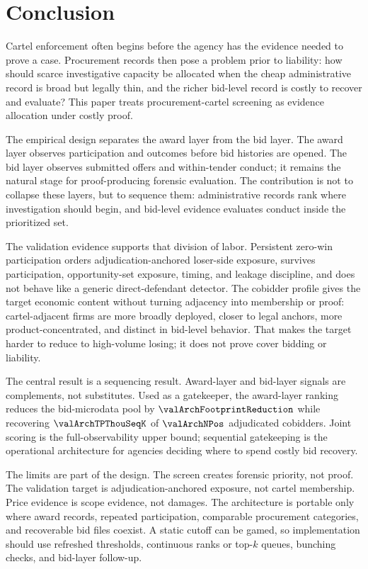 \section{Conclusion}
\label{sec:conclusion}

Cartel enforcement often begins before the agency has the
evidence needed to prove a case. Procurement records then pose a
problem prior to liability: how should scarce investigative
capacity be allocated when the cheap administrative record is
broad but legally thin, and the richer bid-level record is costly
to recover and evaluate? This paper treats procurement-cartel
screening as evidence allocation under costly proof.

The empirical design separates the award layer from the bid
layer. The award layer observes participation and outcomes before
bid histories are opened. The bid layer observes submitted offers
and within-tender conduct; it remains the natural stage for
proof-producing forensic evaluation. The contribution is not to
collapse these layers, but to sequence them: administrative
records rank where investigation should begin, and bid-level
evidence evaluates conduct inside the prioritized set.

The validation evidence supports that division of labor.
Persistent zero-win participation orders adjudication-anchored
loser-side exposure, survives participation, opportunity-set
exposure, timing, and leakage discipline, and does not behave
like a generic direct-defendant detector. The cobidder profile
gives the target economic content without turning adjacency into
membership or proof: cartel-adjacent firms are more broadly
deployed, closer to legal anchors, more product-concentrated, and
distinct in bid-level behavior. That makes the target harder to
reduce to high-volume losing; it does not prove cover bidding or
liability.

The central result is a sequencing result. Award-layer and
bid-layer signals are complements, not substitutes. Used as a
gatekeeper, the award-layer ranking reduces the bid-microdata
pool by $\valArchFootprintReduction$ while recovering
$\valArchTPThouSeqK$ of $\valArchNPos$ adjudicated cobidders.
Joint scoring is the full-observability upper bound; sequential
gatekeeping is the operational architecture for agencies deciding
where to spend costly bid recovery.

The limits are part of the design. The screen creates forensic
priority, not proof. The validation target is
adjudication-anchored exposure, not cartel membership. Price
evidence is scope evidence, not damages. The architecture is
portable only where award records, repeated participation,
comparable procurement categories, and recoverable bid files
coexist. A static cutoff can be gamed, so implementation should
use refreshed thresholds, continuous ranks or top-$k$ queues,
bunching checks, and bid-layer follow-up.

